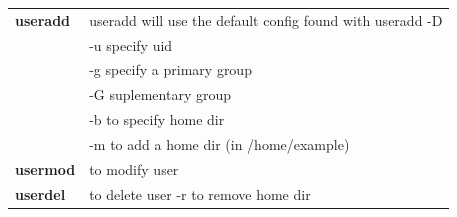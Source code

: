 \documentclass[10pt]{article}
\begin{document}
\begin{center}
	\begin{tabular}{l|l}
		\textbf{useradd} &useradd will use the default config found with useradd -D\\
						 &-u specify uid\\
						 &-g specify a primary group\\
						 &-G suplementary group\\
						 &-b to specify home dir\\
						 &-m to add a home dir (in /home/example)\\
		\textbf{usermod} & to modify user\\
		\textbf{userdel} & to delete user -r to remove home dir\\
	\end{tabular}
\end{center}
\end{document}
